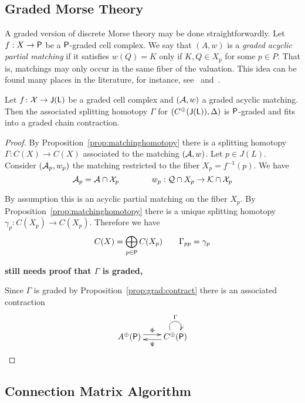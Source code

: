 \subsection{Graded Morse Theory}

A graded version of discrete Morse theory may be done straightforwardly.   Let $f:X\to {\mathsf P}$ be a ${\mathsf P}$-graded cell complex.  We say that $(A,w)$ is a {\em graded acyclic partial matching} if it satisfies $w(Q)=K$ only if $K,Q\in X_p$ for some $p\in P$.  That is, matchings may only occur in the same fiber of the valuation.  This idea can be found many places in the literature, for instance, see~\cite{mn} and~\cite[Patchwork Theorem]{koz}.

\begin{prop}
Let $f\colon {\mathcal X} \to {\mathsf J}({\mathsf L})$ be a graded cell complex and $({\mathcal A},w)$ a graded acyclic matching.  Then the associated splitting homotopy $\Gamma$ for $(C^\oplus({\mathsf J}({\mathsf L})),\Delta)$ is ${\mathsf P}$-graded and fits into a graded chain contraction.
\end{prop}
\begin{proof}
By Proposition~\ref{prop:matchinghomotopy} there is a splitting homotopy $\Gamma:C(X)\to C(X)$ associated to the matching $({\mathcal A},w)$.  Let $p\in J(L)$.  Consider $({\mathcal A}_p,w_p)$ the matching restricted to the fiber $X_p = f^{-1}(p)$.  We have $${\mathcal A}_p = {\mathcal A}\cap {\mathcal X}_p\quad\quad \quad \quad  w_p:{\mathcal Q}\cap X_p\to {\mathcal K}\cap {\mathcal X}_p$$

By assumption this is an acyclic partial matching on the fiber $X_p$.  By Proposition~\ref{prop:matchinghomotopy} there is a unique splitting homotopy $\gamma_p:C(X_p)\to C(X_p)$.    Therefore we have $$C(X) = \bigoplus_{p\in {\mathsf P}} C(X_p) \quad\quad \Gamma_{pp} = \gamma_p$$ 

{\bf still needs proof that $\Gamma$ is graded, }

Since $\Gamma$ is graded by Proposition~\ref{prop:grad:contract} there is an associated contraction
\[
\xymatrixrowsep{0.03in}
\xymatrixcolsep{0.3in}
\xymatrix{
A^\oplus(\sP)  \ar[r]<3pt>^{\Phi} & \ar[l]<3pt>^{\Psi} C^\oplus(\sP) \ar@(ul,ur)^{\Gamma}
}
\]

\end{proof}



\subsection{Connection Matrix Algorithm}

